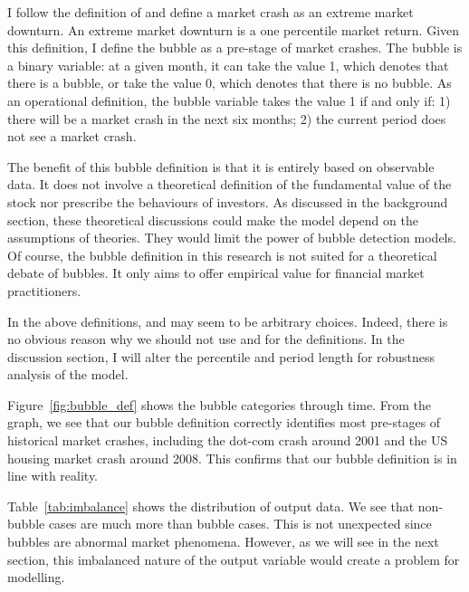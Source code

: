 \documentclass[12pt, man, a4paper, floatsintext]{apa7}
\begin{document}
I follow the definition of \textcite{Chat2018} and define a market crash as an extreme market downturn. An extreme market downturn is a one percentile market return. Given this definition, I define the bubble as a pre-stage of market crashes. The bubble is a binary variable: at a given month, it can take the value 1, which denotes that there is a bubble, or take the value 0, which denotes that there is no bubble. As an operational definition, the bubble variable takes the value 1 if and only if: 1) there will be a market crash in the next six months; 2) the current period does not see a market crash. 

The benefit of this bubble definition is that it is entirely based on observable data. It does not involve a theoretical definition of the fundamental value of the stock nor prescribe the behaviours of investors. As discussed in the background section, these theoretical discussions could make the model depend on the assumptions of theories. They would limit the power of bubble detection models. Of course, the bubble definition in this research is not suited for a theoretical debate of bubbles. It only aims to offer empirical value for financial market practitioners.

In the above definitions,  and  may seem to be arbitrary choices. Indeed, there is no obvious reason why we should not use  and  for the definitions. In the discussion section, I will alter the percentile and period length for robustness analysis of the model.

Figure~\ref{fig:bubble_def} shows the bubble categories through time. From the graph, we see that our bubble definition correctly identifies most pre-stages of historical market crashes, including the dot-com crash around 2001 and the US housing market crash around 2008. This confirms that our bubble definition is in line with reality.

Table~\ref{tab:imbalance} shows the distribution of output data. We see that non-bubble cases are much more than bubble cases. This is not unexpected since bubbles are abnormal market phenomena. However, as we will see in the next section, this imbalanced nature of the output variable would create a problem for modelling. 
\end{document}
